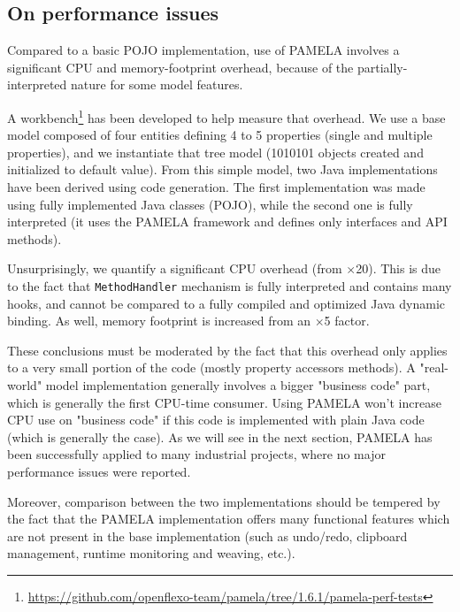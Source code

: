 \subsection{On performance issues}

Compared to a basic POJO implementation, use of PAMELA involves a significant CPU and memory-footprint overhead, because of the partially-interpreted nature for some model features.

A workbench\footnote {\url{https://github.com/openflexo-team/pamela/tree/1.6.1/pamela-perf-tests}} has been developed to help measure that overhead. We use a base model composed of four entities defining 4 to 5 properties (single and multiple properties), and we instantiate that tree model (1010101 objects created and initialized to default value). From this simple model, two Java implementations have been derived using code generation. The first implementation was made using fully implemented Java classes (POJO), while the second one is fully interpreted (it uses the PAMELA framework and defines only interfaces and API methods). 

Unsurprisingly, we quantify a significant CPU overhead (from $\times$20). This is due to the fact that \texttt{MethodHandler} mechanism is fully interpreted and contains many hooks, and cannot be compared to a fully compiled and optimized Java dynamic binding. As well, memory footprint is increased from an 
$\times$5 factor.

These conclusions must be moderated by the fact that this overhead only applies
to a very small portion of the code (mostly property accessors methods). A "real-world" model implementation generally involves a bigger "business code" part, which is generally the first CPU-time consumer. Using PAMELA won’t increase CPU use on "business code" if this code is implemented with plain Java code (which is generally the case). As we will see in the next section, PAMELA has been successfully applied to many industrial projects, where no major performance issues were reported.

Moreover, comparison between the two implementations should be tempered by the fact that the PAMELA implementation offers many functional features which are not present in the base implementation (such as undo/redo, clipboard management, runtime monitoring and weaving, etc.).


